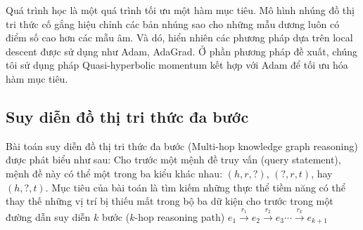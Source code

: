 Quá trình học là một quá trình tối ưu một hàm mục tiêu. Mô hình nhúng đồ thị tri thức cố gắng hiệu chỉnh các bản nhúng sao cho những mẫu dương luôn có điểm số cao hơn các mẫu âm. Và dó, hiển nhiên các phương pháp dựa trên local descent được sử dụng như Adam, AdaGrad. Ở phần phương pháp đề xuất, chúng tôi sử dụng pháp Quasi-hyperbolic momentum kết hợp với Adam để tối ưu hóa hàm mục tiêu.

\subsection{Suy diễn đồ thị tri thức đa bước}

Bài toán suy diễn đồ thị tri thức đa bước (Multi-hop knowledge graph reasoning) được phát biểu như sau: Cho trước một mệnh đề truy vấn (query statement), mệnh đề này có thể một trong ba kiểu khác nhau: $(h, r, ?)$, $(?, r, t)$, hay $(h, ?, t)$. Mục tiêu của bài toán là tìm kiếm những thực thể tiềm năng có thể thay thế những vị trí bị thiếu mất trong bộ ba dữ kiện cho trước trong một đường dẫn suy diễn $k$ bước ($k$-hop reasoning path) $e_1 \overset{r_1}{\rightarrow} e_2 \overset{r_2}{\rightarrow} e_3 \cdots \overset{r_k}{\rightarrow} e_{k+1}$






